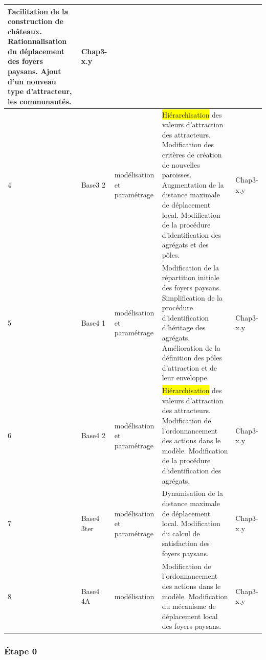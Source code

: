 \documentclass[12pt, a4paper, oneside]{book}
\begin{document}
\begin{footnotesize}
\begin{longtable}{ m{} m{}  m{}  m{}  m{}  }
			Facilitation de la construction de châteaux. \newline
			Rationnalisation du déplacement des foyers paysans. \newline
			Ajout d'un nouveau type d'attracteur, les communautés. & Chap3-x.y\\
			\hline
			4 & Base3 2 & modélisation et paramétrage & \colorbox{yellow}{Hiérarchisation} des valeurs d'attraction des attracteurs. \newline
			Modification des critères de création de nouvelles paroisses. \newline
			Augmentation de la distance maximale de déplacement local. \newline
			Modification de la procédure d'identification des agrégats et des pôles. & Chap3-x.y\\
			\hline
			5 & Base4 1 & modélisation et paramétrage & 
			Modification de la répartition initiale des foyers paysans.\newline
			Simplification de la procédure d'identification d'héritage des agrégats.
			Amélioration de la définition des pôles d'attraction et de leur enveloppe. & Chap3-x.y\\
			\hline
			6 & Base4 2 & modélisation et paramétrage & \colorbox{yellow}{Hiérarchisation} des valeurs d'attraction des attracteurs. \newline
			Modification de l'ordonnancement des actions dans le modèle.\newline
			Modification de la procédure d'identification des agrégats. & Chap3-x.y\\
			\hline
			7 & Base4 3ter & modélisation et paramétrage &
			Dynamisation de la distance maximale de déplacement local.\newline
			Modification du calcul de satisfaction des foyers paysans. & Chap3-x.y\\
			\hline
			8 & Base4 4A & modélisation & Modification de l'ordonnancement des actions dans le modèle.\newline
			Modification du mécanisme de déplacement local des foyers paysans. & Chap3-x.y\\
			\hline
			
		\end{longtable}
	\end{footnotesize}

	\subsubsection{Étape 0}
	
\end{document}
